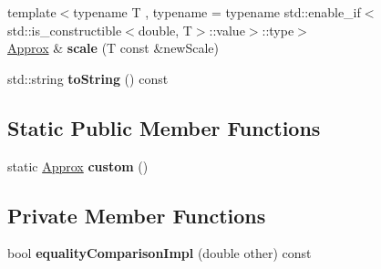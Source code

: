 \begin{DoxyCompactItemize}
\item 
\mbox{\label{class_catch_1_1_detail_1_1_approx_a8f4d2def2920a3840d3271f6d9c5ede2}} 
{\footnotesize template$<$typename T , typename  = typename std\+::enable\+\_\+if$<$std\+::is\+\_\+constructible$<$double, T$>$\+::value$>$\+::type$>$ }\\\mbox{\hyperlink{class_catch_1_1_detail_1_1_approx}{Approx}} \& {\bfseries scale} (T const \&new\+Scale)
\item 
\mbox{\label{class_catch_1_1_detail_1_1_approx_a972fd9ac60607483263f1b0f0f9955e6}} 
std\+::string {\bfseries to\+String} () const
\end{DoxyCompactItemize}
\subsection*{Static Public Member Functions}
\begin{DoxyCompactItemize}
\item 
\mbox{\label{class_catch_1_1_detail_1_1_approx_aaf86dc0ee92272ac2d9839197a07951d}} 
static \mbox{\hyperlink{class_catch_1_1_detail_1_1_approx}{Approx}} {\bfseries custom} ()
\end{DoxyCompactItemize}
\subsection*{Private Member Functions}
\begin{DoxyCompactItemize}
\item 
\mbox{\label{class_catch_1_1_detail_1_1_approx_af53c48227a7b654da58adeb1d360b715}} 
bool {\bfseries equality\+Comparison\+Impl} (double other) const
\end{DoxyCompactItemize}
